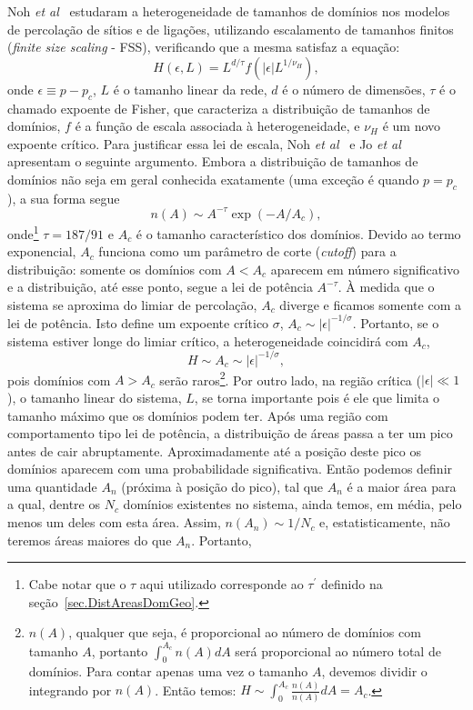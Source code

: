 Noh \textit{et al}~\cite{NohLeePark} estudaram a heterogeneidade de tamanhos de domínios nos modelos de percolação de sítios e de ligações, utilizando escalamento de tamanhos finitos (\textit{finite size scaling} - FSS), verificando que a mesma satisfaz a equação:
\begin{equation}
 \label{eq.HetPerc}
 H(\epsilon,L) = L^{d/\tau} f(|\epsilon| L^{1/\nu_H}),
\end{equation} 
onde $\epsilon \equiv p-p_c$, $L$ é o tamanho linear da rede, $d$ é o número de dimensões, $\tau$ é o chamado expoente de Fisher, que caracteriza a distribuição de tamanhos de domínios, $f$ é a função de escala associada à heterogeneidade, e $\nu_H$ é um novo expoente crítico. Para justificar essa lei de escala, Noh \textit{et al}~\cite{NohLeePark} e Jo \textit{et al}~\cite{JoYiBaekKim} apresentam o seguinte argumento. Embora a distribuição de tamanhos de domínios não seja em geral conhecida exatamente (uma exceção é quando $p=p_c$), a sua forma segue
\begin{equation}
n(A) \sim A^{-\tau} \exp(-A/A_c),
\end{equation}
onde\footnote{Cabe notar que o $\tau$ aqui utilizado corresponde ao $\tau^\prime$ definido na seção~\ref{sec.DistAreasDomGeo}.} $\tau=187/91$ e $A_c$ é o tamanho característico dos domínios. Devido ao termo exponencial, $A_c$ funciona como um parâmetro de corte (\textit{cutoff}) para a distribuição: somente os domínios com $A<A_c$ aparecem em número significativo e a distribuição, até esse ponto, segue a lei de potência $A^{-\tau}$. À medida que o sistema se aproxima do limiar de percolação, $A_c$ diverge e ficamos somente com a lei de potência. Isto define um expoente crítico $\sigma$, $A_c \sim |\epsilon|^{-1/\sigma}$. Portanto, se o sistema estiver longe do limiar crítico, a heterogeneidade coincidirá com $A_c$,
$$
H \sim A_c \sim |\epsilon|^{-1/\sigma},
$$ 
pois domínios com $A>A_c$ serão raros\footnote{$n(A)$, qualquer que seja, é proporcional ao número de domínios com tamanho $A$, portanto $\int_0^{A_c}n(A)dA$ será proporcional ao número total de domínios. Para contar apenas uma vez o tamanho $A$, devemos dividir o integrando por $n(A)$. Então temos: $H \sim \int_0^{A_c}\frac{n(A)}{n(A)}dA = A_c$.}. Por outro lado, na região crítica ($|\epsilon|\ll 1$), o tamanho linear do sistema, $L$, se torna importante pois é ele que limita o tamanho máximo que os domínios podem ter. Após uma região com comportamento tipo lei de potência, a distribuição de áreas passa a ter um pico antes de cair abruptamente. Aproximadamente até a posição deste pico os domínios aparecem com uma probabilidade significativa. Então podemos definir uma quantidade $A_n$ (próxima à posição do pico), tal que $A_n$ é a maior área para a qual, dentre os $N_c$ domínios existentes no sistema, ainda temos, em média, pelo menos um deles com esta área. Assim, $n(A_n) \sim 1/N_c$ e, estatisticamente, não teremos áreas maiores do que $A_n$. Portanto, 
